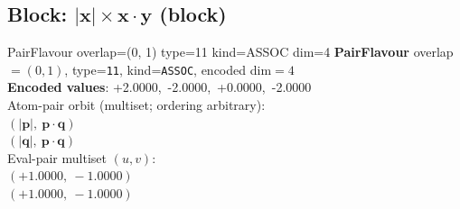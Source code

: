 \documentclass[a4paper,11pt]{article}
\newcommand{\vc}[1]{\ensuremath{\mathbf{#1}}}
\newcommand{\dnfagmiihhiejm}[1]{|\vc{#1}|}
\newcommand{\pdcegfomjfhook}[2]{\mathbf{#1} \cdot \mathbf{#2}}
\begin{document}
\subsection{Block: $\dnfagmiihhiejm{x} \times \pdcegfomjfhook{x}{y}$  (block)}
    PairFlavour  overlap=(0, 1)  type=11  kind=ASSOC  dim=4
\textbf{PairFlavour} overlap$=(0, 1)$, type=\texttt{11}, kind=\texttt{ASSOC}, encoded dim$=4$\\
\textbf{      Encoded values}: +2.0000,\ -2.0000,\ +0.0000,\ -2.0000\\
\quad Atom-pair orbit (multiset; ordering arbitrary):\\
$(\dnfagmiihhiejm{p},\ \pdcegfomjfhook{p}{q})$\\
$(\dnfagmiihhiejm{q},\ \pdcegfomjfhook{p}{q})$\\
\quad Eval-pair multiset $(u, v)$:\\
$(+1.0000,\ -1.0000)$\\
$(+1.0000,\ -1.0000)$\\
\end{document}
